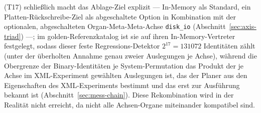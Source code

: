 \begin{nurlang}
(T17) schließlich macht das Ablage-Ziel explizit --- In-Memory als Standard, ein
Platten-Rückschreibe-Ziel als abgeschaltete Option in Kombination mit der optionalen, abgeschalteten
Organ-Meta-Meta-Achse \texttt{disk\_io} (Abschnitt~\ref{sec:axis-triad}) ---; im golden-Referenzkatalog
ist sie auf ihren In-Memory-Vertreter festgelegt, sodass dieser feste Regressions-Detektor $2^{17} = 131072$
Identitäten zählt (unter der überholten Annahme genau zweier Auslegungen je Achse), während die Obergrenze der
Binary-Identitäten je System-Permutation das Produkt der je Achse im XML-Experiment gewählten Auslegungen ist,
das der Planer aus den Eigenschaften des XML-Experiments bestimmt und das erst zur Ausführung bekannt ist
(Abschnitt~\ref{sec:mess-chain}). Diese Rekombination wird in
der Realität nicht erreicht, da nicht alle Achsen-Organe miteinander kompatibel sind.
\end{nurlang}
